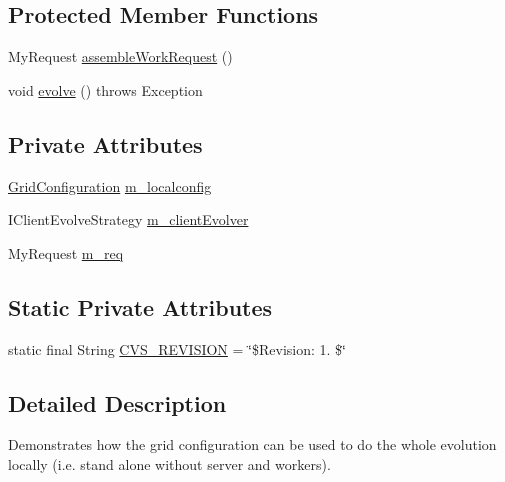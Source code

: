 \subsection*{Protected Member Functions}
\begin{DoxyCompactItemize}
\item 
My\-Request \hyperlink{classexamples_1_1grid_1_1evolution_distributed_1_1_local_evolution_demo_af9be8fc03dc972482768ab2630079f1b}{assemble\-Work\-Request} ()
\item 
void \hyperlink{classexamples_1_1grid_1_1evolution_distributed_1_1_local_evolution_demo_a9729391105e08c9bc81b515b907f5aa1}{evolve} ()  throws Exception 
\end{DoxyCompactItemize}
\subsection*{Private Attributes}
\begin{DoxyCompactItemize}
\item 
\hyperlink{classexamples_1_1grid_1_1evolution_distributed_1_1_grid_configuration}{Grid\-Configuration} \hyperlink{classexamples_1_1grid_1_1evolution_distributed_1_1_local_evolution_demo_abde92093fa558697aafd74f680183cf9}{m\-\_\-localconfig}
\item 
I\-Client\-Evolve\-Strategy \hyperlink{classexamples_1_1grid_1_1evolution_distributed_1_1_local_evolution_demo_ac103e14a2676fda0d390fe58bf830c68}{m\-\_\-client\-Evolver}
\item 
My\-Request \hyperlink{classexamples_1_1grid_1_1evolution_distributed_1_1_local_evolution_demo_a6aed0955894a41cd1cd26b23ecfb3022}{m\-\_\-req}
\end{DoxyCompactItemize}
\subsection*{Static Private Attributes}
\begin{DoxyCompactItemize}
\item 
static final String \hyperlink{classexamples_1_1grid_1_1evolution_distributed_1_1_local_evolution_demo_a42275b97c574b91c0538866b747ba676}{C\-V\-S\-\_\-\-R\-E\-V\-I\-S\-I\-O\-N} = \char`\"{}\$Revision\-: 1. \$\char`\"{}
\end{DoxyCompactItemize}


\subsection{Detailed Description}
Demonstrates how the grid configuration can be used to do the whole evolution locally (i.\-e. stand alone without server and workers).

